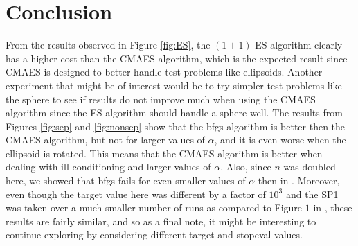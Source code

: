 \documentclass[sigconf, 6pt]{acmart}
\begin{document}
\section{Conclusion}
\label{con}
From the results observed in Figure \ref{fig:ES}, the $(1+1)$-ES algorithm clearly has a higher cost than the CMAES algorithm, which is the expected result since CMAES is designed to better handle test problems like ellipsoids. Another experiment that might be of interest would be to try simpler test problems like the sphere to see if results do not improve much when using the CMAES algorithm since the ES algorithm should handle a sphere well. The results from Figures \ref{fig:sep} and \ref{fig:nonsep} show that the bfgs algorithm is better then the CMAES algorithm, but not for larger values of $\alpha$, and it is even worse when the ellipsoid is rotated. This means that the CMAES algorithm is better when dealing with ill-conditioning and larger values of $\alpha$. Also, since $n$ was doubled here, we showed that bfgs fails for even smaller values of $\alpha$ then in \cite{derivativefree}. Moreover, even though the target value here was different by a factor of $10^3$ and the SP1 was taken over a much smaller number of runs as compared to Figure $1$ in \cite{derivativefree}, these results are fairly similar, and so as a final note, it might be interesting to continue exploring by considering different target and stopeval values.




\end{document}
